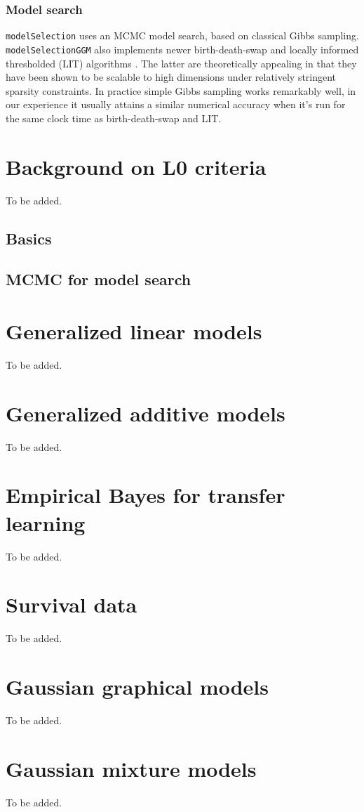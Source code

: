 \documentclass[
]{book}
\theoremstyle{definition}
\theoremstyle{definition}
\theoremstyle{definition}
\theoremstyle{definition}
\theoremstyle{remark}
\begin{document}
\subsection{Model search}\label{model-search}

\texttt{modelSelection} uses an MCMC model search, based on classical Gibbs sampling.
\texttt{modelSelectionGGM} also implements newer birth-death-swap \citep{yangyun:2016} and locally informed thresholded (LIT) algorithms \citep{zhou_quan:2022}. The latter are theoretically appealing in that they have been shown to be scalable to high dimensions under relatively stringent sparsity constraints. In practice simple Gibbs sampling works remarkably well, in our experience it usually attains a similar numerical accuracy when it's run for the same clock time as birth-death-swap and LIT.

\chapter{Background on L0 criteria}\label{background-l0}

To be added.

\section{Basics}\label{basics}

\section{MCMC for model search}\label{mcmc-for-model-search}

\chapter{Generalized linear models}\label{glm}

To be added.

\chapter{Generalized additive models}\label{gam}

To be added.

\chapter{Empirical Bayes for transfer learning}\label{eBayes}

To be added.

\chapter{Survival data}\label{survival}

To be added.

\chapter{Gaussian graphical models}\label{ggm}

To be added.

\chapter{Gaussian mixture models}\label{mixtures}

To be added.

  
\end{document}
